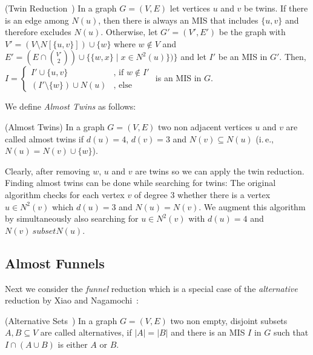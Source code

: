 \documentclass[a4paper,UKenglish,cleveref, autoref, thm-restate]{lipics-v2021}
\newcommand{\ie}{i.\,e.,\xspace}
\begin{document}
\begin{theorem} (Twin Reduction~\cite{XiaoUnconfined}) In a graph $G=(V,E)$ let
  vertices $u$ and $v$ be twins. If there is an edge among $N(u)$, then there is
  always an MIS that includes $\{u,v\}$ and therefore
  excludes $N(u)$. Otherwise, let $G'=(V',E')$ be the graph with $V'=(V\setminus
  N[\{u,v\}])\cup\{w\}$ where $w\notin V$ and $E'=(E\cap\binom{V'}{2})\cup
  \{\{w,x\}\;|\;x\in N^2(u)\})\}$ and let $I'$ be an MIS in $G'$. Then, 
  $
  I=\begin{cases}
    I'\cup \{u,v\} & \text{, if }w\notin I'\\
    (I'\setminus \{w\})\cup N(u) & \text{, else} %
  \end{cases}
  $
  is an MIS in $G$.
\end{theorem}

We define \emph{Almost Twins} as follows:
\begin{definition} (Almost Twins)
  In a graph $G=(V,E)$ two non adjacent vertices $u$ and $v$ are called almost twins if $d(u) = 4$, $d(v) = 3$ and $N(v)\subseteq N(u)$ (\ie $N(u) = N(v) \cup \{w\}$). 
\end{definition}

Clearly, after removing $w$, $u$ and $v$ are twins so we can apply the twin
reduction. Finding almost twins can be done while searching for twins: The
original algorithm checks for each vertex $v$ of degree $3$ whether there is a
vertex $u \in N^2(v)$ which $d(u) = 3$ and $N(u) = N(v)$. We augment this
algorithm by simultaneously also searching for $u \in N^2(v)$ with $d(u) = 4$
and $N(v) \ subset N(u)$. 

\subsection{Almost Funnels}
\label{sec:almost_funnels}

Next we consider the \emph{funnel} reduction which is a special case of the
\emph{alternative} reduction by Xiao and Nagamochi~\cite{XiaoUnconfined}:

\begin{definition} (Alternative Sets~\cite{XiaoUnconfined})
	In a graph $G=(V,E)$ two non empty, disjoint subsets $A,B\subseteq V$ are
    called alternatives, if $|A| = |B|$ and there is an MIS $I$ in $G$ such that $I\cap(A\cup B)$ is either $A$ or $B$.
\end{definition}
\end{document}
